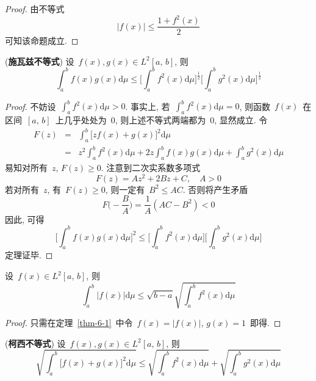 \begin{proof}
由不等式
\[
|f(x)|\leqslant \frac{1+f^{2}(x)}{2}
\]
可知该命题成立.
\end{proof}

\begin{Theorem} \label{thm-6-1}
(\textbf{施瓦兹不等式}) 设~$f(x), g(x)\in L^2[a,\,b]$, 则
\[
\int_{a}^{b}f(x)g(x)\mathrm{d}\mu \leqslant \Big[\int_{a}^{b}f^{2}(x)\mathrm{d}\mu\Big]^{\frac{1}{2}}\Big[\int_{a}^{b}g^{2}(x)\mathrm{d}\mu\Big]^{\frac{1}{2}}
\]
\end{Theorem}

\begin{proof}
不妨设~$\int_{a}^{b}f^{2}(x)\mathrm{d}\mu>0$. 事实上, 若~$\int_{a}^{b}f^{2}(x)\mathrm{d}\mu=0$, 则函数~$f(x)$~在区间~$\left[a,\,b\right]$~上几乎处处为~0, 则上述不等式两端都为~0, 显然成立.
令
\begin{eqnarray*}
F(z)&=&\int_{a}^{b}\big[z f(x)+g(x)\big]^{2}\mathrm{d}\mu \\
&=& z^{2}\int_{a}^{b}f^{2}(x)\mathrm{d}\mu+2z\int_{a}^{b}f(x)g(x)\mathrm{d}\mu+\int_{a}^{b}g^{2}(x)\mathrm{d}\mu
\end{eqnarray*}
易知对所有~$z$, $F(z)\geqslant 0$. 注意到二次实系数多项式
\[
F(z)=Az^{2}+2Bz+C,\quad A>0
\]
若对所有~$z$, 有~$F(z)\geqslant 0$, 则一定有~$B^{2}\leqslant AC$. 否则将产生矛盾
\[
F\Big(-\frac{B}{A}\Big)=\frac{1}{A}(AC-B^{2})<0
\]
因此, 可得
\[
\Big[\int_{a}^{b}f(x)g(x)\mathrm{d}\mu\Big]^{2} \leqslant \Big[\int_{a}^{b}f^{2}(x)\mathrm{d}\mu\Big]\Big[\int_{a}^{b}g^{2}(x)\mathrm{d}\mu\Big]
\]
定理证毕.
\end{proof}



\begin{Corollary}\label{cor-6-1}
设~$f(x) \in L^2[a,\,b]$, 则
\[
\int_{a}^{b}|f(x)|\mathrm{d}\mu \leqslant \sqrt{b-a}\sqrt{\textstyle{\int_{a}^{b}f^{2}(x)\mathrm{d}\mu}}
\]
\end{Corollary}

\begin{proof}
只需在定理~\ref{thm-6-1}~中令~$f(x)=|f(x)|$, $g(x)=1$~即得.
\end{proof}

\begin{Theorem} \label{thm-6-2}
(\textbf{柯西不等式}) 设~$f(x), g(x)\in L^2[a,\,b]$, 则
\[
\sqrt{\textstyle{\int_{a}^{b}\big[f(x)+g(x)\big]^{2}\mathrm{d}\mu}} \leqslant \sqrt{\textstyle{\int_{a}^{b}f^{2}(x)\mathrm{d}\mu}}+\sqrt{\textstyle{\int_{a}^{b}g^{2}(x)\mathrm{d}\mu}}
\]
\end{Theorem}


